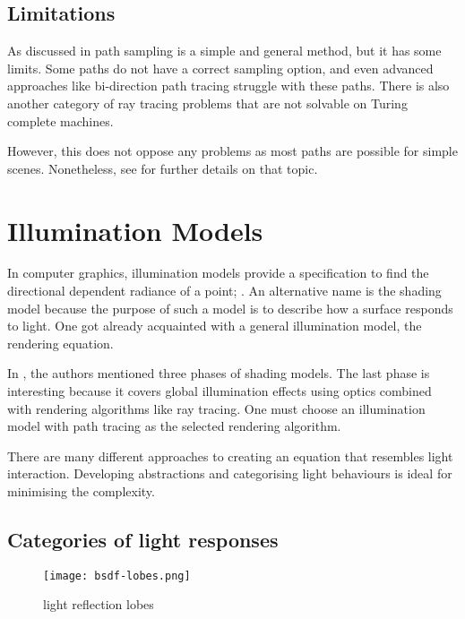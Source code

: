 \subsection{Limitations}

As discussed in \cite{veach_robust_1997} path sampling is a simple and general method, but it has some limits.
Some paths do not have a correct sampling option, and even advanced approaches like bi-direction path tracing struggle with these paths.
There is also another category of ray tracing problems that are not solvable on Turing complete machines.

However, this does not oppose any problems as most paths are possible for simple scenes.
Nonetheless, see \cite{veach_robust_1997} for further details on that topic.

\section{Illumination Models}

In computer graphics, illumination models provide a specification to find the directional dependent radiance of a point; \cite{duin_beleuchtungsalgorithmen_1993}. 
An alternative name is the shading model because the purpose of such a model is to describe how a surface responds to light.
One got already acquainted with a general illumination model, the rendering equation.

In \cite{duin_beleuchtungsalgorithmen_1993}, the authors mentioned three phases of shading models.
The last phase is interesting because it covers global illumination effects using optics combined with rendering algorithms like ray tracing.
One must choose an illumination model with path tracing as the selected rendering algorithm.

There are many different approaches to creating an equation that resembles light interaction.
Developing abstractions and categorising light behaviours is ideal for minimising the complexity.

\subsection{Categories of light responses}

\begin{figure}[h]
\centering
\texttt{[image: bsdf-lobes.png]}
\caption[]{light reflection lobes}
\label{fig:bsdf-lobes}
\end{figure}

